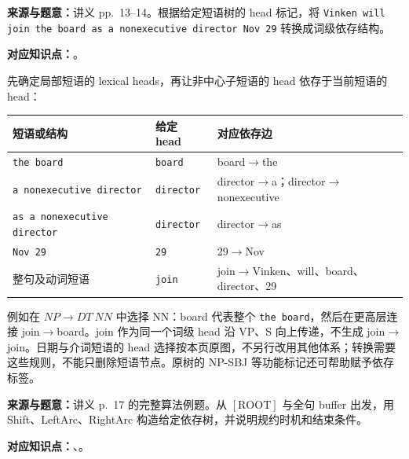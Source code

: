 
\textbf{来源与题意：}讲义 pp.~13--14。根据给定短语树的 head 标记，将 \texttt{Vinken will join the board as a nonexecutive director Nov 29} 转换成词级依存结构。

\textbf{对应知识点：}。

\begin{workedsolution}
先确定局部短语的 lexical heads，再让非中心子短语的 head 依存于当前短语的 head：
\begin{center}
\small
\begin{tabularx}{\textwidth}{@{}l l X@{}}
\toprule
短语或结构 & 给定 head & 对应依存边 \\
\midrule
\texttt{the board} & \texttt{board} & board$\rightarrow$the \\
\texttt{a nonexecutive director} & \texttt{director} & director$\rightarrow$a；director$\rightarrow$nonexecutive \\
\texttt{as a nonexecutive director} & \texttt{director} & director$\rightarrow$as \\
\texttt{Nov 29} & \texttt{29} & 29$\rightarrow$Nov \\
整句及动词短语 & \texttt{join} & join$\rightarrow$Vinken、will、board、director、29 \\
\bottomrule
\end{tabularx}
\end{center}
例如在 $NP\rightarrow DT\ NN$ 中选择 NN：board 代表整个 \texttt{the board}，然后在更高层连接 join$\rightarrow$board。join 作为同一个词级 head 沿 VP、S 向上传递，不生成 join$\rightarrow$join。日期与介词短语的 head 选择按本页原图，不另行改用其他体系；转换需要这些规则，不能只删除短语节点。原树的 NP-SBJ 等功能标记还可帮助赋予依存标签。
\end{workedsolution}


\textbf{来源与题意：}讲义 p.~17 的完整算法例题。从 $[\mathrm{ROOT}]$ 与全句 buffer 出发，用 Shift、LeftArc、RightArc 构造给定依存树，并说明规约时机和结束条件。

\textbf{对应知识点：}、。

